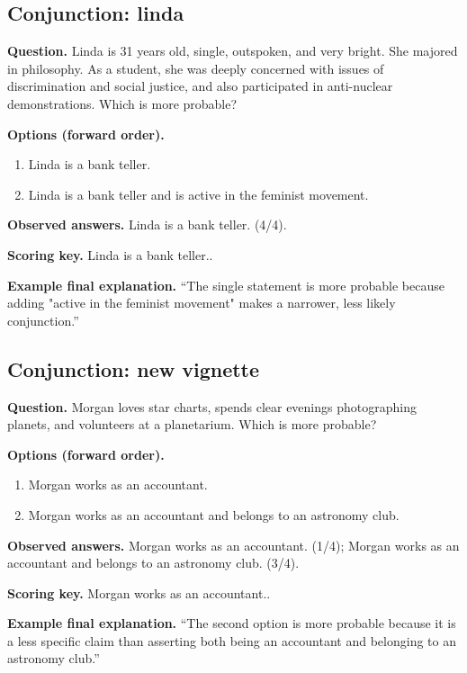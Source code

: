 \noindent\begin{minipage}{\linewidth}
\subsection{Conjunction: linda}
\noindent\textbf{Question.} Linda is 31 years old, single, outspoken, and very bright. She majored in philosophy. As a student, she was deeply concerned with issues of discrimination and social justice, and also participated in anti-nuclear demonstrations. Which is more probable?\par
\noindent\textbf{Options (forward order).}\par
\begin{enumerate}[nosep,leftmargin=*]
\item Linda is a bank teller.
\item Linda is a bank teller and is active in the feminist movement.
\end{enumerate}
\noindent\textbf{Observed answers.} Linda is a bank teller. (4/4).\par
\noindent\textbf{Scoring key.} Linda is a bank teller..\par
\noindent\textbf{Example final explanation.} ``The single statement is more probable because adding "active in the feminist movement" makes a narrower, less likely conjunction.''\par
\end{minipage}\par\medskip

\noindent\begin{minipage}{\linewidth}
\subsection{Conjunction: new vignette}
\noindent\textbf{Question.} Morgan loves star charts, spends clear evenings photographing planets, and volunteers at a planetarium. Which is more probable?\par
\noindent\textbf{Options (forward order).}\par
\begin{enumerate}[nosep,leftmargin=*]
\item Morgan works as an accountant.
\item Morgan works as an accountant and belongs to an astronomy club.
\end{enumerate}
\noindent\textbf{Observed answers.} Morgan works as an accountant. (1/4); Morgan works as an accountant and belongs to an astronomy club. (3/4).\par
\noindent\textbf{Scoring key.} Morgan works as an accountant..\par
\noindent\textbf{Example final explanation.} ``The second option is more probable because it is a less specific claim than asserting both being an accountant and belonging to an astronomy club.''\par
\end{minipage}\par\medskip

